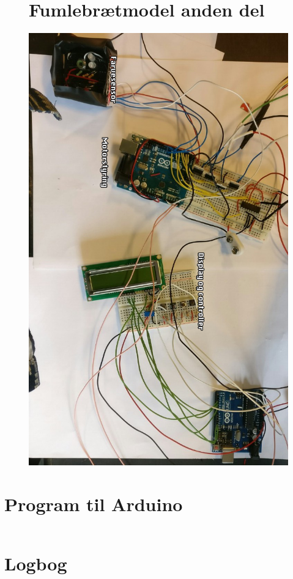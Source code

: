 \begin{figure}[H]
\section{Fumlebrætmodel anden del}
	\centering
    \includegraphics[width=13cm]{figures/2_5fremstilling/prototyper/rumleKreds.png}
\end{figure}


\section{Program til Arduino}
\label{bilag:program}
\begin{lstlisting}

\end{lstlisting}


\section{Logbog} 